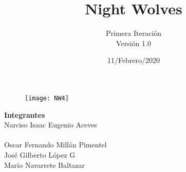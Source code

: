 \documentclass[12pt]{article}
\title{\textbf{Night Wolves}}
\author{Primera Iteración\\Versión 1.0\\}
\date{11/Febrero/2020}
\begin{document}
\begin{figure}
	\centering
	\texttt{[image: NW4]}
\end{figure}

\maketitle

\begin{center}
	\textbf{Integrantes}\\
	Narciso Isaac Eugenio Aceves \\\\ Oscar Fernando Millán Pimentel
	\\José Gilberto López G \\ Mario Navarrete Baltazar
\end{center}
\end{document}
